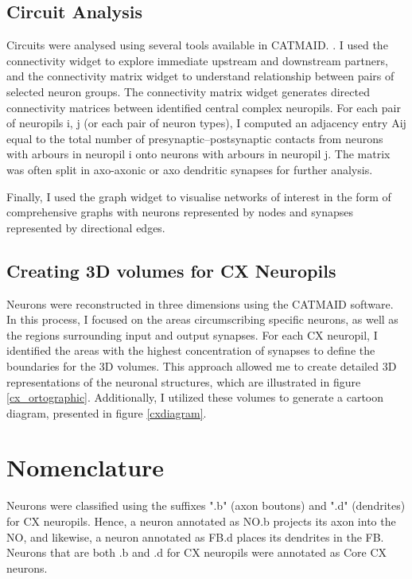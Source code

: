     \subsection{Circuit Analysis}
    Circuits were analysed using several tools available in CATMAID. \citep{schneider2016quantitative, saalfeld2009catmaid}. I used the connectivity widget to explore immediate upstream and downstream partners, and the connectivity matrix widget to understand relationship between pairs of selected neuron groups. The connectivity matrix widget generates directed connectivity matrices between identified central complex neuropils. For each pair of neuropils i, j (or each pair of neuron types), I computed an adjacency entry A{ij} equal to the total number of presynaptic–postsynaptic contacts from neurons with arbours in neuropil i onto neurons with arbours in neuropil j. The matrix was often split in axo-axonic or axo dendritic synapses for further analysis. 
    
    Finally, I used the graph widget to visualise networks of interest in the form of comprehensive graphs with neurons represented by nodes and synapses represented by directional edges.

   \subsection{Creating 3D volumes for CX Neuropils}
    Neurons were reconstructed in three dimensions using the CATMAID software. In this process, I focused on the areas circumscribing specific neurons, as well as the regions surrounding input and output synapses. For each CX neuropil, I identified the areas with the highest concentration of synapses to define the boundaries for the 3D volumes. This approach allowed me to create detailed 3D representations of the neuronal structures, which are illustrated in figure \ref{cx_ortographic}. Additionally, I utilized these volumes to generate a cartoon diagram, presented in figure \ref{cxdiagram}.

\section{Nomenclature}
 \label{nomenclature}
 Neurons were classified using the suffixes ".b" (axon boutons) and ".d" (dendrites) for CX neuropils.
Hence, a neuron annotated as NO.b projects its axon into the NO, and likewise, a neuron annotated as FB.d places its dendrites in the FB.
Neurons that are both .b and .d for CX neuropils were annotated as Core CX neurons.

